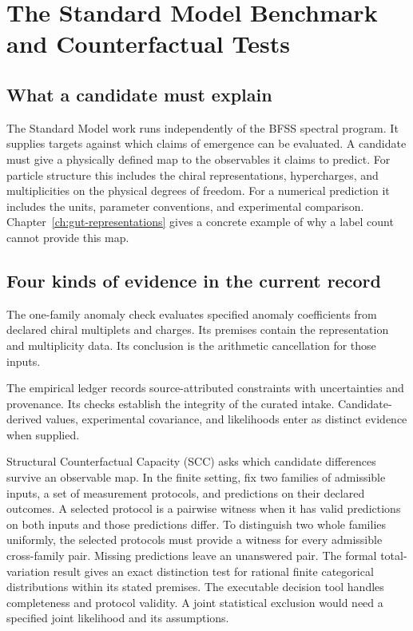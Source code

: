 \chapter[Standard Model and Counterfactual Tests]{The Standard Model Benchmark and Counterfactual Tests}
\label{ch:sm-benchmark}

\section{What a candidate must explain}
The Standard Model work runs independently of the BFSS spectral
program. It supplies targets against which claims of emergence can
be evaluated. A candidate must give a physically defined map to the
observables it claims to predict. For particle structure this includes
the chiral representations, hypercharges, and multiplicities on the
physical degrees of freedom. For a numerical prediction it includes
the units, parameter conventions, and experimental comparison.
Chapter~\ref{ch:gut-representations} gives a concrete example of why
a label count cannot provide this map.

\section{Four kinds of evidence in the current record}
The one-family anomaly check evaluates specified anomaly coefficients
from declared chiral multiplets and charges. Its premises contain the
representation and multiplicity data. Its conclusion is the arithmetic
cancellation for those inputs.

The empirical ledger records source-attributed constraints with
uncertainties and provenance. Its checks establish the integrity of
the curated intake. Candidate-derived values, experimental covariance,
and likelihoods enter as distinct evidence when supplied.

Structural Counterfactual Capacity (SCC) asks which candidate
differences survive an observable map. In the finite setting, fix
two families of admissible inputs, a set of measurement protocols,
and predictions on their declared outcomes. A selected protocol is
a pairwise witness when it has valid predictions on both inputs and
those predictions differ. To distinguish two whole families uniformly,
the selected protocols must provide a witness for every admissible
cross-family pair. Missing predictions leave an unanswered pair.
The formal total-variation result gives an exact distinction test
for rational finite categorical distributions within its stated
premises. The executable decision tool handles completeness and
protocol validity. A joint statistical exclusion would need a
specified joint likelihood and its assumptions.

